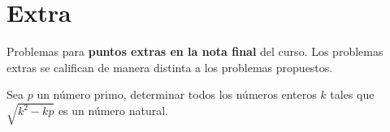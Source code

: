 \section{Extra}

Problemas para \textbf{puntos extras en la nota final} del curso.
Los problemas extras se califican de manera distinta a los problemas propuestos.

\begin{problem}
    Sea $p$ un número primo, determinar todos los números enteros $k$ tales que $\sqrt {k^2 - kp}$ es un número natural.
\end{problem}